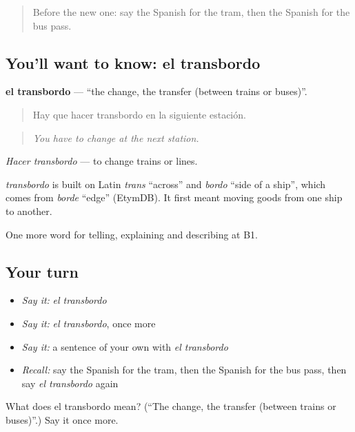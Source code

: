\begin{quote}
Before the new one: say the Spanish for the tram, then the Spanish for the bus pass.
\end{quote}

\subsection*{You'll want to know: el transbordo}
\textbf{el transbordo} — \textquotedblleft{}the change, the transfer (between trains or buses)\textquotedblright{}.

\begin{quote}
Hay que hacer transbordo en la siguiente estación.
\end{quote}

\begin{quote}
\emph{You have to change at the next station.}
\end{quote}

\emph{Hacer transbordo} — to change trains or lines.

\begin{cousinweb}
\emph{transbordo} is built on Latin \emph{trans} \textquotedblleft{}across\textquotedblright{} and \emph{bordo} \textquotedblleft{}side of a ship\textquotedblright{}, which comes from \emph{borde} \textquotedblleft{}edge\textquotedblright{} (EtymDB). It first meant moving goods from one ship to another.
\end{cousinweb}

\begin{grammarlens}[title={What you've built}]
One more word for telling, explaining and describing at B1.
\end{grammarlens}

\subsection*{Your turn}
\begin{itemize}
\raggedright
  \item \emph{Say it:} \emph{el transbordo}
  \item \emph{Say it:} \emph{el transbordo}, once more
  \item \emph{Say it:} a sentence of your own with \emph{el transbordo}
  \item \emph{Recall:} say the Spanish for the tram, then the Spanish for the bus pass, then say \emph{el transbordo} again
\end{itemize}

\begin{tcolorbox}[breakable,colback=teal!4,colframe=teal!35!black,title={Before you move on}]
What does el transbordo mean? (\textquotedblleft{}The change, the transfer (between trains or buses)\textquotedblright{}.) Say it once more.
\end{tcolorbox}

